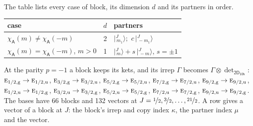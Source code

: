 \documentclass[10pt,a4paper]{article}
\numberwithin{equation}{section}
\newcommand{\grp}[1]{\mathsf{#1}}
\newcommand{\irr}[1]{\text{\normalfont\scshape #1}}
\newcommand{\ptag}[1]{\mathrm{#1}}
\newcommand{\chiA}{\chi_{\grp{A}}}
\newcommand{\irrprod}{\otimes}
\newcommand{\mult}{\kappa}
\newcommand{\intx}{\mu}
\newcommand{\jm}[2]{\bigl\lvert{}^{#1}_{\,#2}\bigr\rangle}
\begin{document}
\leavevmode\label{n:head.case}\label{n:head.partners}The table lists every case of block, its dimension $d$ and its partners in order.
\begin{center}\begin{tabular}{@{}lrl@{}}\toprule
case & $d$ & partners\\\midrule
$\chiA(m) \ne \chiA(-m)$ & 2 & $\jm{J}{m_1}$;\ $c\,\jm{J}{-m_1}$\\
$\chiA(m) = \chiA(-m)$, $m > 0$ & 1 & $\jm{J}{m} + s\,\jm{J}{-m}$, $s = \pm1$\\
\bottomrule\end{tabular}\end{center}
At the parity $p = -1$ a block keeps its kets, and its irrep $\Gamma$ becomes $\Gamma \irrprod \det_{\grp{2D_{10h}}}$: $\irr{e}_{1/2,\ptag{g}} \to \irr{e}_{1/2,\ptag{u}}$, $\irr{e}_{3/2,\ptag{g}} \to \irr{e}_{3/2,\ptag{u}}$, $\irr{e}_{5/2,\ptag{g}} \to \irr{e}_{5/2,\ptag{u}}$, $\irr{e}_{7/2,\ptag{g}} \to \irr{e}_{7/2,\ptag{u}}$, $\irr{e}_{9/2,\ptag{g}} \to \irr{e}_{9/2,\ptag{u}}$, $\irr{e}_{1/2,\ptag{u}} \to \irr{e}_{1/2,\ptag{g}}$, $\irr{e}_{3/2,\ptag{u}} \to \irr{e}_{3/2,\ptag{g}}$, $\irr{e}_{5/2,\ptag{u}} \to \irr{e}_{5/2,\ptag{g}}$, $\irr{e}_{7/2,\ptag{u}} \to \irr{e}_{7/2,\ptag{g}}$, $\irr{e}_{9/2,\ptag{u}} \to \irr{e}_{9/2,\ptag{g}}$.
The bases have 66 blocks and 132 vectors at $J = \nicefrac{1}{2}, \nicefrac{3}{2}, \dots, \nicefrac{21}{2}$. \label{n:head.vector}A row gives a vector of a block at $J$: the block's irrep and copy index $\mult$, the partner index $\intx$ and the vector.
\end{document}
